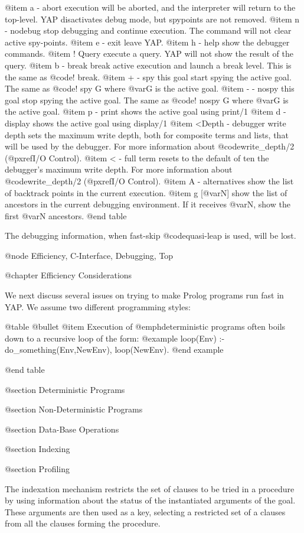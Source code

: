 {{{{{{{{@item a - abort
execution will be aborted, and the interpreter will return to the
top-level. YAP disactivates debug mode, but spypoints are not removed.
@item n - nodebug
stop debugging and continue execution. The command will not clear active
spy-points.
@item e - exit
leave YAP.
@item h - help
show the debugger commands.
@item ! Query
execute a query. YAP will not show the result of the query.
@item b - break
break active execution and launch a break level. This is  the same as @code{!
break}.
@item + - spy this goal
start spying the active goal. The same as @code{! spy  G} where @var{G}
is the active goal.
@item - - nospy this goal
stop spying the active goal. The same as @code{! nospy G} where @var{G} is
the active goal.
@item p - print
shows the active goal using print/1
@item d - display
shows the active goal using display/1
@item <Depth - debugger write depth
sets the maximum write depth, both for composite terms and lists, that
will be used by the debugger. For more
information about @code{write_depth/2} (@pxref{I/O Control}).
@item < - full term
resets to the default of ten the debugger's maximum write depth. For
more information about @code{write_depth/2} (@pxref{I/O Control}).
@item A - alternatives
 show the list of backtrack points in the current execution. 
@item g [@var{N}] 
 show the list of ancestors in the current debugging environment. If it
 receives @var{N}, show the first @var{N} ancestors.
@end table

The debugging information, when fast-skip @code{quasi-leap} is used, will
be lost.

@node Efficiency, C-Interface, Debugging, Top

@chapter Efficiency Considerations

We next discuss several issues on trying to make Prolog programs run
fast in YAP. We assume two different programming styles:

@table @bullet
@item Execution of @emph{deterministic} programs often
boils down to a recursive loop of the form:
@example
loop(Env) :-
        do_something(Env,NewEnv),
        loop(NewEnv).
@end example

@end table

@section Deterministic Programs

@section Non-Deterministic Programs

@section Data-Base Operations

@section Indexing

@section Profiling

The indexation mechanism restricts the set of clauses to be tried in a
procedure by using information about the status of the instantiated
arguments of the goal.  These arguments are then used as a key,
selecting a restricted set of a clauses from all the clauses forming the
procedure.

}}}}}}}}
